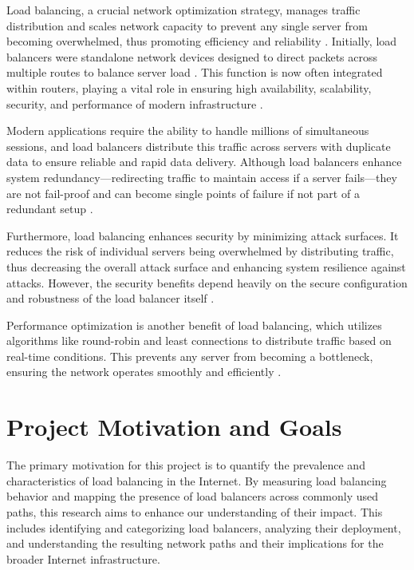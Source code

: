 \documentclass[12pt]{cwru_thesis}
\begin{document}
Load balancing, a crucial network optimization strategy, manages traffic distribution and scales network capacity to prevent any single server from becoming overwhelmed, thus promoting efficiency and reliability \cite{10371400}. Initially, load balancers were standalone network devices designed to direct packets across multiple routes to balance server load \cite{bourke2001server}. This function is now often integrated within routers, playing a vital role in ensuring high availability, scalability, security, and performance of modern infrastructure \cite{f52023loadbalancing}.

Modern applications require the ability to handle millions of simultaneous sessions, and load balancers distribute this traffic across servers with duplicate data to ensure reliable and rapid data delivery. Although load balancers enhance system redundancy—redirecting traffic to maintain access if a server fails—they are not fail-proof and can become single points of failure if not part of a redundant setup \cite{chang2005complex}.

Furthermore, load balancing enhances security by minimizing attack surfaces. It reduces the risk of individual servers being overwhelmed by distributing traffic, thus decreasing the overall attack surface and enhancing system resilience against attacks. However, the security benefits depend heavily on the secure configuration and robustness of the load balancer itself \cite{10.1145/3098593.3098595}.

Performance optimization is another benefit of load balancing, which utilizes algorithms like round-robin and least connections to distribute traffic based on real-time conditions. This prevents any server from becoming a bottleneck, ensuring the network operates smoothly and efficiently \cite{8316818}.


\section{Project Motivation and Goals}

The primary motivation for this project is to quantify the prevalence and characteristics of load balancing in the Internet. By measuring load balancing behavior and mapping the presence of load balancers across commonly used paths, this research aims to enhance our understanding of their impact. This includes identifying and categorizing load balancers, analyzing their deployment, and understanding the resulting network paths and their implications for the broader Internet infrastructure.
\end{document}
